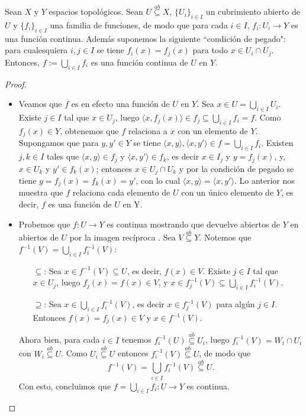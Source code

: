 \begin{theorem}\label{tma:lemaPegado}
   Sean $X$ y $Y$ espacios topológicos. Sean $U\stackrel{ab}\subseteq X$, $\{U_i\}_{i\in I}$ un cubrimiento abierto de $U$ y $\{f_i\}_{i\in I}$ una familia de funciones, de modo que para cada $i\in I$, $f_i:U_i\to Y$ es una función continua. Además suponemos la siguiente ``condición de pegado": para cualesquiera $i,j\in I$ se tiene $f_i(x)=f_j(x)$ para todo $x\in U_i \cap U_j$. Entonces, $f:=\bigcup_{i\in I}f_i$ es una función continua de $U$ en $Y$.
\end{theorem}
\begin{proof}
   \begin{itemize}
      \item Veamos que $f$ es en efecto una función de $U$ en $Y$. Sea $x\in U=\bigcup_{i\in I} U_i$. Existe $j\in I$ tal que $x\in U_j$, luego $\langle x,f_j(x)\rangle\in f_j \subseteq \bigcup_{i\in I} f_i =f$. Como $f_j(x)\in Y$, obtenemos que $f$ relaciona a $x$ con un elemento de $Y$. Supongamos que para $y,y'\in Y$ se tiene $\langle x,y\rangle, \langle x,y'\rangle\in f=\bigcup_{i\in I}f_i$. Existen $j,k\in I$ tales que $\langle x,y\rangle\in f_j$ y $\langle x,y'\rangle\in f_k$, es decir $x\in I_j$ y $y=f_j(x)$, y, $x\in U_k$ y $y'\in f_k(x)$; entonces $x\in U_j\cap U_k$ y por la condición de pegado se tiene $y=f_j(x)=f_k(x)=y'$, con lo cual $\langle x,y\rangle=\langle x,y'\rangle$. Lo anterior nos muestra que $f$ relaciona cada elemento de $U$ con un único elemento de $Y$, es decir, $f$ es una función de $U$ en Y.
      \item Probemos que $f:U\to Y$ es continua mostrando que devuelve abiertos de $Y$ en abiertos de $U$ por la imagen recíproca . Sea $V\stackrel{ab}\subseteq Y$. Notemos que $f^{-1}(V)=\bigcup_{i\in I} f_i^{-1}(V)$:
         \begin{itemize}
            \item[$\subseteq$:] Sea $x\in f^{-1}(V)\subseteq U$, es decir, $f(x)\in V$. Existe $j\in I$ tal que $x\in U_j$, luego $f_j(x)=f(x)\in V$, y $x\in f_j^{-1}(V)\subseteq\bigcup_{i\in I}f_i^{-1}(V)$. 
            \item[$\supseteq$:] Sea $x\in\bigcup_{i\in I} f_i^{-1}(V)$, es decir $x\in f_j^{-1}(V)$ para algún $j\in I$. Entonces $f(x)=f_j(x)\in V$ y $x\in f^{-1}(V)$.
         \end{itemize}
         Ahora bien, para cada $i\in I$ tenemos $f_i^{-1}(U)\stackrel{ab}\subseteq U_i$, luego $f_i^{-1}(V)=W_i\cap U_i$ con $W_i\stackrel{ab}\subseteq U$. Como $U_i \stackrel{ab}\subseteq U$ entonces $f_i^{-1}(V) \stackrel{ab}\subseteq U$, de modo que
         $$
         f^{-1}(V)=\bigcup_{i\in I}f_i^{-1}(V) \stackrel{ab}\subseteq U. 
         $$
         Con esto, concluimos que $f=\bigcup_{i\in I}f_i:U\to  Y$ es continua.
   \end{itemize}
\end{proof}

